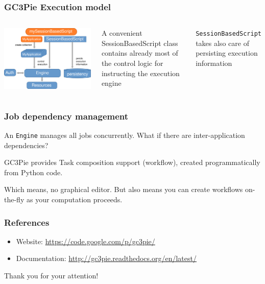 \documentclass[english,serif,mathserif,xcolor=pdftex,dvipsnames,table]{beamer}
\begin{document}
\begin{frame}
  \frametitle{GC3Pie Execution model}
  \begin{columns}
      \includegraphics[width=1\textwidth]{fig/GC3Pie_execution_model}
  \begin{block}{}
    A convenient {\color{Blue}SessionBasedScript} class contains already
    most of the control logic for instructing the execution engine
  \end{block}

  \begin{block}{}
    \texttt{SessionBasedScript} takes also care of {\color{Blue}persisting}
    execution information
  \end{block}
  \end{columns}
\end{frame}


\begin{frame}
\frametitle{Job dependency management}
  \begin{block}{}
  An \texttt{Engine} manages all jobs concurrently.
  What if there are inter-application dependencies?
  \end{block}

  \begin{block}{}
  GC3Pie provides {\color{Blue}Task composition} support (workflow), created
  programmatically from Python code.
  \end{block}

  \begin{block}{}
  Which means, no graphical editor.  But also means you can create
  workflows {\color{Blue}on-the-fly} as your computation proceeds.
  \end{block}
\end{frame}

\begin{frame}
  \frametitle{References}
  \begin{itemize}
  \item Website: \url{https://code.google.com/p/gc3pie/}
  \item Documentation: \url{http://gc3pie.readthedocs.org/en/latest/}
  \end{itemize}
\begin{center}
Thank you for your attention!
\end{center}
\end{frame}
\end{document}
